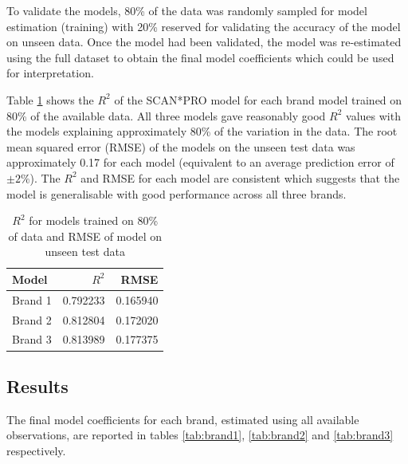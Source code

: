 \documentclass[a4paper,11pt]{article}
\begin{document}
To validate the models, 80\% of the data was randomly sampled for model estimation (training) with 20\% reserved for validating the accuracy of the model on unseen data. Once the model had been validated, the model was re-estimated using the full dataset to obtain the final model coefficients which could be used for interpretation.

Table \ref{tab:val-results} shows the $R^2$ of the SCAN*PRO model for each brand model trained on 80\% of the available data. All three models gave reasonably good $R^2$ values with the models explaining approximately 80\% of the variation in the data. The root mean squared error (RMSE) of the models on the unseen test data was approximately 0.17 for each model (equivalent to an average prediction error of $\pm 2\%$). The $R^2$ and RMSE for each model are consistent which suggests that the model is generalisable with good performance across all three brands.


\begin{table}
\centering
\caption{$R^2$ for models trained on 80\% of data and RMSE of model on unseen test data}\label{tab:val-results}
\begin{tabular}{lrr}
\toprule
Model &        $R^2$ &      RMSE \\
\midrule
Brand 1 &  0.792233 &  0.165940 \\
Brand 2 &  0.812804 &  0.172020 \\
Brand 3 &  0.813989 &  0.177375 \\
\bottomrule
\end{tabular}
\end{table}


\subsection{Results}
The final model coefficients for each brand, estimated using all available observations, are reported in tables \ref{tab:brand1}, \ref{tab:brand2} and \ref{tab:brand3} respectively.
\end{document}
